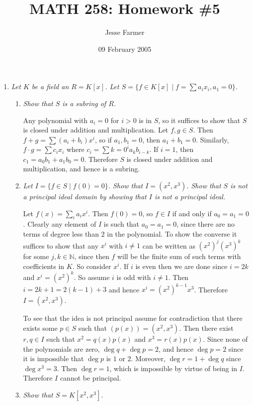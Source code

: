 \documentclass[10pt]{article}
\title{MATH 258: Homework \#5}
\author{Jesse Farmer}
\date{09 February 2005}
\newcommand{\N}{\mathbb{N}}
\begin{document}
\maketitle
\begin{enumerate}

\item \emph{Let $K$ be a field an $R = K[x]$.  Let $S = \{ f \in K[x] \mid f = \sum a_i x_i, a_1 = 0\}$.}
\begin{enumerate}
\item \emph{Show that $S$ is a subring of $R$.}

Any polynomial with $a_i = 0$ for $i > 0$ is in $S$, so it suffices to show that $S$ is closed under addition and multiplication.  Let $f,g \in S$. Then $f+ g = \sum (a_i+b_i)x^i$, so if $a_1,b_1 = 0$, then $a_1 + b_1 = 0$.  Similarly, $f \cdot g = \sum c_i x_i$ where $c_i = \sum{k=0}^i a_k b_{i-k}$.  If $i = 1$, then $c_1 = a_0b_1 + a_1b_0 = 0$.  Therefore $S$ is closed under addition and multiplication, and hence is a subring.

\item \emph{Let $I = \{f \in S \mid f(0) = 0\}$.  Show that $I = (x^2, x^3)$.  Show that $S$ is not a principal ideal domain by showing that $I$ is not a principal ideal.}

Let $f(x) = \sum_{i} a_i x^i$.  Then $f(0) = 0$, so $f \in I$ if and only if $a_0 = a_1 = 0$.  Clearly any element of $I$ is such that $a_0 = a_1 = 0$, since there are no terms of degree less than $2$ in the polynomial.  To show the converse it suffices to show that any $x^i$ with $i \neq 1$ can be written as $(x^2)^j(x^3)^k$ for some $j,k \in \N$, since then $f$ will be the finite sum of such terms with coefficients in $K$.  So consider $x^i$.  If $i$ is even then we are done since $i = 2k$ and $x^i = (x^2)^k$.  So assume $i$ is odd with $i \neq 1$.  Then $i = 2k+1 = 2(k-1) + 3$ and hence $x^i = (x^2)^{k-1}x^3$.  Therefore $I = (x^2, x^3)$.

To see that the idea is not principal assume for contradiction that there exists some $p \in S$ such that $(p(x)) = (x^2, x^3)$.  Then there exist $r,q \in I$ such that $x^2 = q(x)p(x)$ and $x^3 = r(x)p(x)$.  Since none of the polynomials are zero, $\deg q + \deg p = 2$, and hence $\deg p = 2$ since it is impossible that $\deg p$ is $1$ or $2$.  Moreover, $\deg r = 1 + \deg q$ since $\deg x^3 = 3$.  Then $\deg r = 1$, which is impossible by virtue of being in $I$.  Therefore $I$ cannot be principal.

\item \emph{Show that $S = K[x^2, x^3]$.}


\end{enumerate}
\end{enumerate}
\end{document}
